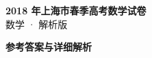 \documentclass[zihao=-4, a4paper]{ctexart}
\begin{document}
\begin{center}
  {\Large\bfseries 2018 年上海市春季高考数学试卷}\\[4pt]
  {\large 数学 · 解析版}
\end{center}
\medskip
{}

\clearpage
{}
\begin{center}{\Large\bfseries 参考答案与详细解析}\end{center}
\medskip

\end{document}
